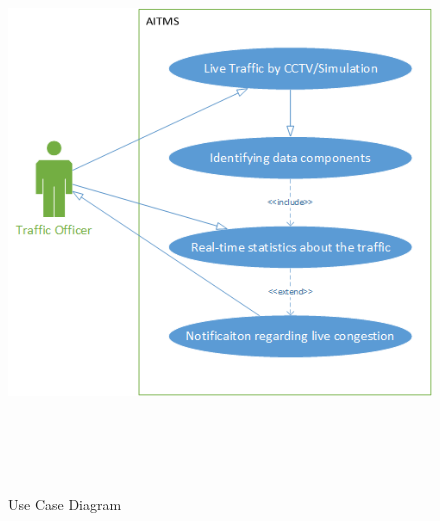 \documentclass[openany,12pt]{report}
\begin{document}
\begin{figure}[H]
\centering
\includegraphics[height=6in]{./diagrams/png/uml}
\caption{Use Case Diagram}
\end{figure}

\newpage
\end{document}
